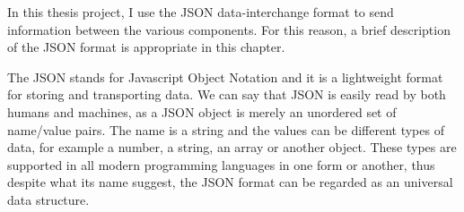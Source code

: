 
In this thesis project, I use the JSON data-interchange format to send information between the various components. For this reason, a brief description of the JSON format is appropriate in this chapter.

The JSON stands for Javascript Object Notation and it is a lightweight format for storing and transporting data. We can say that JSON is easily read by both humans and machines, as a JSON object is merely an unordered set of name/value pairs. The name is a string and the values can be different types of data, for example a number, a string, an array or another object. These types are supported in all modern programming languages in one form or another, thus despite what its name suggest, the JSON format can be regarded as an universal data structure.




